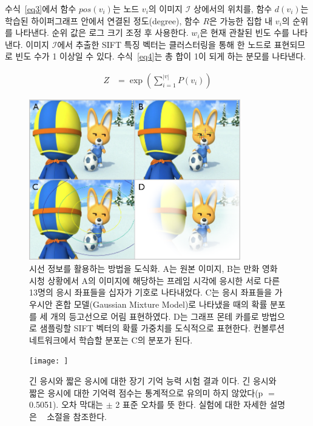 \documentclass{kcc}
\begin{document}
수식~\ref{eq3}에서 함수 $pos(v_{i})$는 노드 $v_{i}$의 이미지 $\mathcal{I}$ 상에서의 위치를, 함수 $d(v_{i})$는 학습된 하이퍼그래프 안에서 연결된 정도(degree), 함수 $R$은 가능한 집합 내 $v_{i}$의 순위를 나타낸다. 순위 값은 로그 크기 조정 후 사용한다. $w_{i}$은 현재 관찰된 빈도 수를 나타낸다. 이미지 $\mathcal{I}$에서 추출한 SIFT 특징 벡터는 클러스터링을 통해 한 노드로 표현되므로 빈도 수가 1 이상일 수 있다. 수식~\ref{eq4}는 총 합이 1이 되게 하는 분모를 나타낸다.

\begin{equation} \label{eq4}
\begin{split}
Z & = \exp(\sum_{i=1}^{|v|}{P(v_{i})})
\end{split}
\end{equation}

\begin{figure}
  \centerline{\includegraphics[width=92mm,height=70mm]{eps/sel_fig2.png}}
  \caption{시선 정보를 활용하는 방법을 도식화. A는 원본 이미지, B는 만화 영화 시청 상황에서 A의 이미지에 해당하는 프레임 시각에 응시한 서로 다른 13명의 응시 좌표들을 십자가 기호로 나타내었다. C는 응시 좌표들을 가우시안 혼합 모델(Gaussian Mixture Model)로 나타냈을 때의 확률 분포를 세 개의 등고선으로 어림 표현하였다. D는 그래프 몬테 카를로 방법으로 샘플링할 SIFT 벡터의 확률 가중치를 도식적으로 표현한다. 컨볼루션 네트워크에서 학습할 분포는 C의 분포가 된다.}
  \label{fig:selective}
\end{figure}

\iffalse
\begin{figure}
  \centerline{\texttt{[image: ]}}
  \caption{긴 응시와 짧은 응시에 대한 장기 기억 능력 시험 결과 이다. 긴 응시와 짧은 응시에 대한 기억력 점수는 통계적으로 유의미 하지 않았다(p $=$ 0.5051). 오차 막대는 $\pm$ 2 표준 오차를 뜻 한다. 실험에 대한 자세한 설명은 ~ 소절을 참조한다.}
  \label{fig:memtest-leng}
\end{figure}
\end{document}
